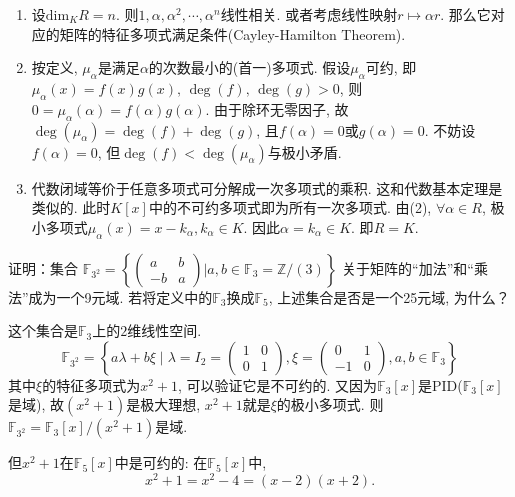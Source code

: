 \begin{solution}
    \begin{enumerate}[(1)]
        \item 设$\mathrm{dim}_K R = n$. 则$1, \alpha, \alpha^2, \cdots, \alpha^n$线性相关. 或者考虑线性映射$r \mapsto \alpha r$. 那么它对应的矩阵的特征多项式满足条件(Cayley-Hamilton Theorem).
        \item 按定义, $\mu_\alpha$是满足$\alpha$的次数最小的(首一)多项式. 假设$\mu_\alpha$可约, 即$\mu_\alpha(x) = f(x)g(x),\, \deg(f),\, \deg(g)> 0$, 则$0 = \mu_\alpha(\alpha) = f(\alpha)g(\alpha)$. 由于除环无零因子, 故$\deg(\mu_\alpha) = \deg(f) + \deg(g)$, 且$f(\alpha) = 0$或$g(\alpha) = 0$. 不妨设$f(\alpha) = 0$, 但$\deg(f) < \deg (\mu_\alpha)$与极小矛盾.
        \item 代数闭域等价于任意多项式可分解成一次多项式的乘积. 这和代数基本定理是类似的. 此时$K[x]$中的不可约多项式即为所有一次多项式. 由(2), $\forall \alpha \in R$, 极小多项式$\mu_\alpha(x) = x - k_\alpha, k_\alpha \in K$. 因此$\alpha = k_\alpha \in K$. 即$R = K$.
    \end{enumerate}
\end{solution}

\begin{problem}
    证明：集合
\(
    \mathbb{F}_{3^2} =
    \left\{
        \begin{pmatrix}
            a & b\\
            -b & a
        \end{pmatrix} 
    \bigg| a, b \in \mathbb{F}_3 = \mathbb{Z}/(3)
    \right\}
\)
关于矩阵的“加法”和“乘法”成为一个9元域.
若将定义中的$\mathbb{F}_3$换成$\mathbb{F}_5$,
上述集合是否是一个25元域, 为什么？
\end{problem}

\begin{solution}
    这个集合是$\mathbb{F}_3$上的$2$维线性空间.
\[
    \mathbb{F}_{3^2} = \left\{ a\lambda + b\xi \mid
    \lambda = I_2 = 
    \begin{pmatrix}
        1 & 0\\
        0 & 1
    \end{pmatrix},
    \xi = 
    \begin{pmatrix} 
        0 & 1\\
        -1 & 0
    \end{pmatrix}, a, b \in \mathbb{F}_3 \right\}
\]
其中$\xi$的特征多项式为$x^2 + 1$, 可以验证它是不可约的. 又因为$\mathbb{F}_3[x]$是PID($\mathbb{F}_3[x]$是域), 故$(x^2 + 1)$是极大理想, $x^2 + 1$就是$\xi$的极小多项式. 则$\mathbb{F}_{3^2} = \mathbb{F}_3[x]/(x^2 + 1)$是域.

但$x^2 + 1$在$\mathbb{F}_5[x]$中是可约的: 在$\mathbb{F}_5[x]$中, 
\[
    x^2 + 1 = x^2 - 4 = (x - 2)(x + 2).
\]
\end{solution}